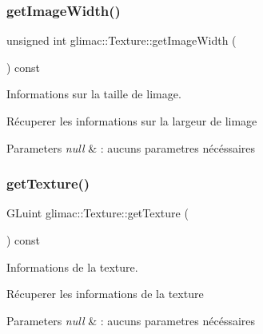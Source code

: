 \subsubsection{\texorpdfstring{get\+Image\+Width()}{getImageWidth()}}
{\footnotesize\ttfamily unsigned int glimac\+::\+Texture\+::get\+Image\+Width (\begin{DoxyParamCaption}{ }\end{DoxyParamCaption}) const\hspace{0.3cm}{\ttfamily [inline]}}



Informations sur la taille de l\textquotesingle{}image. 

Récuperer les informations sur la largeur de l\textquotesingle{}image


\begin{DoxyParams}{Parameters}
{\em null} & \+: aucuns parametres nécéssaires \\
\hline
\end{DoxyParams}
\mbox{\label{classglimac_1_1Texture_a655260d62b7f46682d3531d5d1b5c975}} 
\subsubsection{\texorpdfstring{get\+Texture()}{getTexture()}}
{\footnotesize\ttfamily G\+Luint glimac\+::\+Texture\+::get\+Texture (\begin{DoxyParamCaption}{ }\end{DoxyParamCaption}) const\hspace{0.3cm}{\ttfamily [inline]}}



Informations de la texture. 

Récuperer les informations de la texture


\begin{DoxyParams}{Parameters}
{\em null} & \+: aucuns parametres nécéssaires \\
\hline
\end{DoxyParams}
\mbox{\label{classglimac_1_1Texture_ac222b4e2c040a8b64484bb60eb73574f}} 
